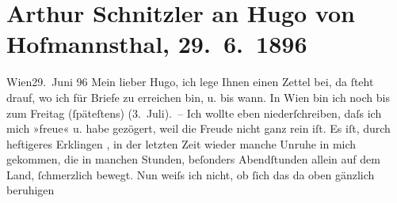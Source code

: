 

         
         \newcommand{\erwaehntePersonen}{Personen: Marie Glümer, Hugo von Hofmannsthal, Hugo August von Hofmannsthal, Anna von Hofmannsthal, Olga Waissnix}
         \newcommand{\erwaehnteOrte}{Orte: Wien}
         \newcommand{\erwaehnteWerke}{Werke: Freiwild. Schauspiel in 3 Akten, Geschichte der beiden Liebespaare}
               \section[Arthur Schnitzler an Hugo von Hofmannsthal, 29. 6. 1896]{ Arthur Schnitzler an Hugo von Hofmannsthal, 29. 6. 1896}\nopagebreak{}\rehead{ }\begin{ledgroupsized}[t]{13cm}\normalsize\beginnumbering \toendnotes[C]{\smallbreak\pagebreak[2]} 
\toendnotes[C]{\smallbreak}\pstart
           \raggedleft{}{\pb}Wien29. Juni 96\pend
           \pstart
           Mein lieber Hugo, ich lege Ihnen einen Zettel bei, da ſteht
                    drauf, wo ich für Briefe zu erreichen bin, u. bis wann. In Wien bin ich noch bis zum Freitag
                    (ſpäteſtens) (3. Juli). –\pend
           \pstart
           Ich wollte eben niederſchreiben, daſs ich mich »freue« u. habe gezögert, weil die
                    Freude nicht ganz rein iſt. Es iſt, durch heftigeres Erklin{\pb}gen \label{K_L00557_1v}\label{K_L00557_1h}, in der letzten Zeit wieder manche Unruhe in mich
                    gekommen, die in manchen Stunden, beſonders Abendſtunden allein auf dem Land,
                    ſchmerzlich bewegt. Nun weiſs ich nicht, ob ſich das da oben gänzlich beruhigen

\end{ledgroupsized}
